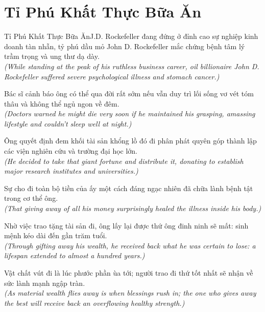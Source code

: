 \section{Tỉ Phú Khất Thực Bữa Ăn}
\begin{truyen}{Tỉ Phú Khất Thực Bữa Ăn}{J.D. Rockefeller}
 đang đứng ở đỉnh cao sự nghiệp kinh doanh tàn nhẫn, tỷ phú dầu mỏ John D. Rockefeller mắc chứng bệnh tâm lý trầm trọng và ung thư dạ dày.\\[4pt]
\textit{(While standing at the peak of his ruthless business career, oil billionaire John D. Rockefeller suffered severe psychological illness and stomach cancer.)}

Bác sĩ cảnh báo ông có thể qua đời rất sớm nếu vẫn duy trì lối sống vơ vét tóm thâu và không thể ngủ ngon về đêm.\\[4pt]
\textit{(Doctors warned he might die very soon if he maintained his grasping, amassing lifestyle and couldn't sleep well at night.)}

Ông quyết định đem khối tài sản khổng lồ đó đi phân phát quyên góp thành lập các viện nghiên cứu và trường đại học lớn.\\[4pt]
\textit{(He decided to take that giant fortune and distribute it, donating to establish major research institutes and universities.)}

Sự cho đi toàn bộ tiền của ấy một cách đáng ngạc nhiên đã chữa lành bệnh tật trong cơ thể ông.\\[4pt]
\textit{(That giving away of all his money surprisingly healed the illness inside his body.)}

Nhờ việc trao tặng tài sản đi, ông lấy lại được thứ ông đinh ninh sẽ mất: sinh mệnh kéo dài đến gần trăm tuổi.\\[4pt]
\textit{(Through gifting away his wealth, he received back what he was certain to lose: a lifespan extended to almost a hundred years.)}

\end{truyen}
\begin{baihoc}
  Vật chất vút đi là lúc phước phần ùa tới; người trao đi thứ tốt nhất sẽ nhận về sức lành mạnh ngập tràn.\\[4pt]
  \textit{(As material wealth flies away is when blessings rush in; the one who gives away the best will receive back an overflowing healthy strength.)}
\end{baihoc}

